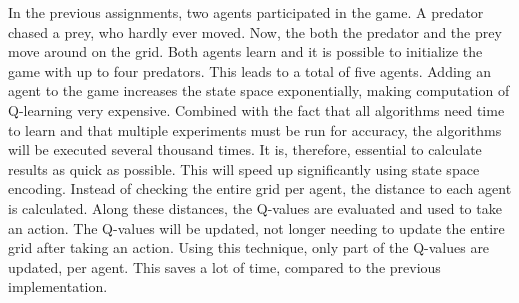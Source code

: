 In the previous assignments, two agents participated in the game. A predator chased a prey, who hardly ever moved. Now, the both the predator and the prey move around on the grid. Both agents learn and it is possible to initialize the game with up to four predators. This leads to a total of five agents. Adding an agent to the game increases the state space exponentially, making computation of Q-learning very expensive. Combined with the fact that all algorithms need time to learn and that multiple experiments must be run for accuracy, the algorithms will be executed several thousand times. It is, therefore, essential to calculate results as quick as possible. This will speed up significantly using state space encoding. Instead of checking the entire grid per agent, the distance to each agent is calculated. Along these distances, the Q-values are evaluated and used to take an action. The Q-values will be updated, not longer needing to update the entire grid after taking an action. Using this technique, only part of the Q-values are updated, per agent. This saves a lot of time, compared to the previous implementation.